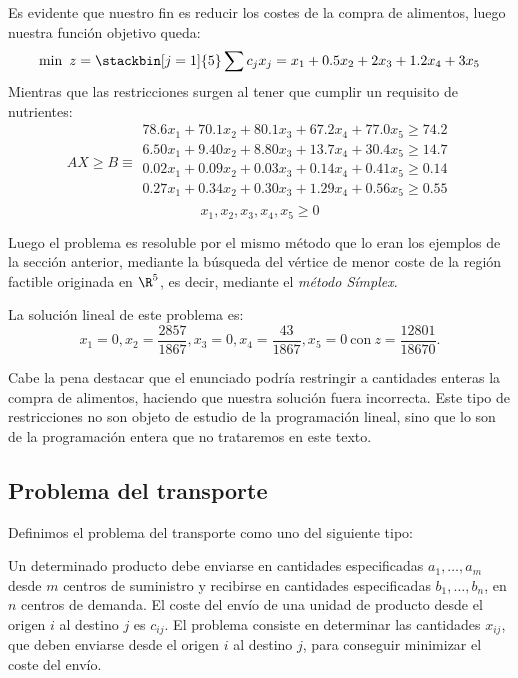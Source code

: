 \begin{ejem}
Es evidente que nuestro fin es reducir los costes de la compra de alimentos, luego nuestra función objetivo queda:
\[\min\ z = \stackbin[j=1]{5}\sum c_jx_j=x_1+0.5x_2+2x_3+1.2x_4+3x_5\]
Mientras que las restricciones surgen al tener que cumplir un requisito de nutrientes:
\[AX\geq B\equiv\left. \begin{array}{ll}	
 78.6x_1+70.1x_2+80.1x_3+67.2x_4+77.0x_5 \geq 74.2\\
 6.50x_1+9.40x_2+8.80x_3+13.7x_4+30.4x_5\geq 14.7\\
 0.02x_1+0.09x_2+0.03x_3+0.14x_4+0.41x_5\geq 0.14\\
 0.27x_1+0.34x_2+0.30x_3+1.29x_4+0.56x_5\geq 0.55\\	 \end{array} \right.\]
\[x_1,x_2,x_3,x_4,x_5\geq 0\]

Luego el problema es resoluble por el mismo método que lo eran los ejemplos de la sección anterior, mediante la búsqueda del vértice de menor coste de la región factible originada en $\R^5$, es decir, mediante el \textit{método Símplex}.

La solución lineal de este problema es:
\[x_1= 0,x_2 = \dfrac{2857}{1867}, x_3 = 0, x_4 = \dfrac{43}{1867}, x_5 = 0\ \mathrm{con\ }z = \dfrac{12801}{18670}.\]

Cabe la pena destacar que el enunciado podría restringir a cantidades enteras la compra de alimentos, haciendo que nuestra solución fuera incorrecta. Este tipo de restricciones no son objeto de estudio de la programación lineal, sino que lo son de la programación entera que no trataremos en este texto.
\end{ejem}

\subsection{Problema del transporte}
\begin{defi} Definimos el problema del transporte como uno del siguiente tipo:

Un determinado producto debe enviarse en cantidades especificadas $a_1,… ,a_m$ desde $m$ centros de suministro y recibirse en cantidades especificadas $b_1,…,b_n$, en $n$ centros de demanda. El coste del envío de una unidad de producto desde el origen $i$ al destino $j$ es $c_{ij}$. El problema consiste en determinar las cantidades $x_{ij}$, que deben enviarse desde el origen $i$ al destino $j$, para conseguir minimizar el coste del envío.
\end{defi}

